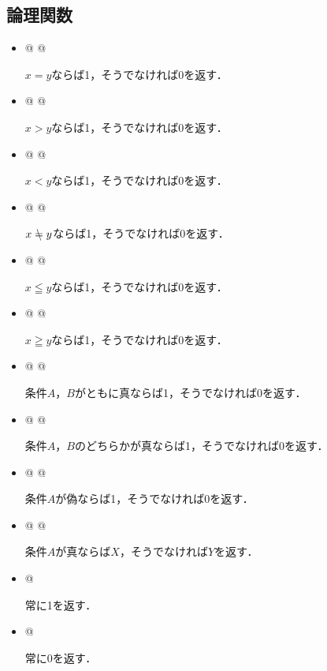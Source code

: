 \documentclass[a4j,uplatex,dvipdfmx]{jsarticle}
\begin{document}
\subsection{論理関数}
\begin{itemize}
 \item \verb@{}@
       \verb@{}@

       $x=y$ならば1，そうでなければ0を返す．
 \item \verb@{}@
       \verb@{}@

       $x>y$ならば1，そうでなければ0を返す．
 \item \verb@{}@
       \verb@{}@

       $x<y$ならば1，そうでなければ0を返す．
 \item \verb@{}@
       \verb@{}@

       $x\Noteq y$ならば1，そうでなければ0を返す．
 \item \verb@{}@
       \verb@{}@

       $x\leqq y$ならば1，そうでなければ0を返す．
 \item \verb@{}@
       \verb@{}@

       $x\geqq y$ならば1，そうでなければ0を返す．
 \item \verb@{}@
       \verb@{}@

       条件$A$，$B$がともに真ならば1，そうでなければ0を返す．
 \item \verb@{}@
       \verb@{}@

       条件$A$，$B$のどちらかが真ならば1，そうでなければ0を返す．
 \item \verb@{}@
       \verb@{}@

       条件$A$が偽ならば1，そうでなければ0を返す．
 \item \verb@{}@
       \verb@{}@

       条件$A$が真ならば$X$，そうでなければ$Y$を返す．
 \item \verb@\pgfmathtrue@
       \verb@{}@

       常に1を返す．
 \item \verb@\pgfmathfalse@
       \verb@{}@

       常に0を返す．
\end{itemize}
\end{document}
